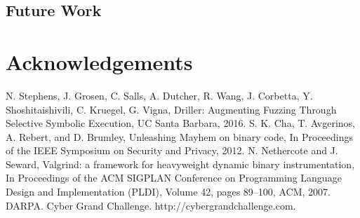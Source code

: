 \documentclass[a4paper]{article}
\begin{document}
\subsection{Future Work}
\label{sec:FutureWork}
\section{Acknowledgements}
\label{sec:Acks}
\begin{thebibliography}{9}
	N. Stephens, J. Grosen, C. Salls, A. Dutcher, R. Wang, J. Corbetta, Y. Shoshitaishivili, C. Kruegel, G.  Vigna,
	Driller: Augmenting Fuzzing Through Selective Symbolic Execution,
	UC Santa Barbara,
	2016.
	S. K. Cha, T. Avgerinos, A. Rebert, and D. Brumley,
	Unleashing Mayhem on binary code,
	In Proceedings of the IEEE Symposium on Security and Privacy,
	2012.
	N. Nethercote and J. Seward,
	Valgrind: a framework for heavyweight dynamic binary instrumentation, 
	In Proceedings of the ACM SIGPLAN Conference on Programming Language Design and Implementation (PLDI),
	Volume 42,
	pages 89–100, 
	ACM,
	2007.
	DARPA. Cyber Grand Challenge. http://cybergrandchallenge.com.
\end{thebibliography}

\end{document}

